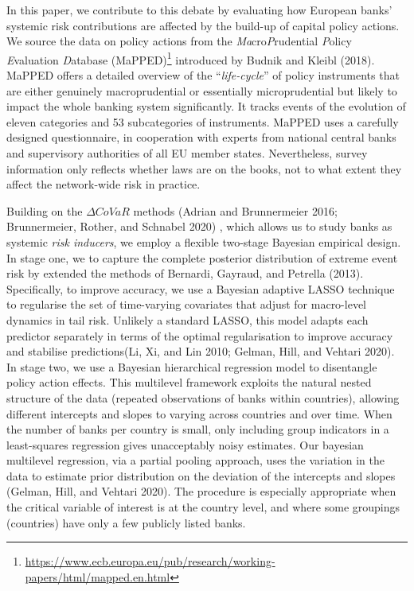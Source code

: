 \documentclass[
  10pt,
]{article}
\begin{document}
In this paper, we contribute to this debate by evaluating how European
banks' systemic risk contributions are affected by the build-up of
capital policy actions. We source the data on policy actions from the
\emph{Ma}cro\emph{P}rudential \emph{P}olicy \emph{E}valuation
\emph{D}atabase (MaPPED)\footnote{\url{https://www.ecb.europa.eu/pub/research/working-papers/html/mapped.en.html}}
introduced by Budnik and Kleibl (2018). MaPPED offers a detailed
overview of the ``\emph{life-cycle}'' of policy instruments that are
either genuinely macroprudential or essentially microprudential but
likely to impact the whole banking system significantly. It tracks
events of the evolution of eleven categories and 53 subcategories of
instruments. MaPPED uses a carefully designed questionnaire, in
cooperation with experts from national central banks and supervisory
authorities of all EU member states. Nevertheless, survey information
only reflects whether laws are on the books, not to what extent they
affect the network-wide risk in practice.

Building on the \(\Delta CoVaR\) methods (Adrian and Brunnermeier 2016;
Brunnermeier, Rother, and Schnabel 2020) , which allows us to study
banks as systemic \emph{risk inducers}, we employ a flexible two-stage
Bayesian empirical design. In stage one, we to capture the complete
posterior distribution of extreme event risk by extended the methods of
Bernardi, Gayraud, and Petrella (2013). Specifically, to improve
accuracy, we use a Bayesian adaptive LASSO technique to regularise the
set of time-varying covariates that adjust for macro-level dynamics in
tail risk. Unlikely a standard LASSO, this model adapts each predictor
separately in terms of the optimal regularisation to improve accuracy
and stabilise predictions(Li, Xi, and Lin 2010; Gelman, Hill, and
Vehtari 2020). In stage two, we use a Bayesian hierarchical regression
model to disentangle policy action effects. This multilevel framework
exploits the natural nested structure of the data (repeated observations
of banks within countries), allowing different intercepts and slopes to
varying across countries and over time. When the number of banks per
country is small, only including group indicators in a least-squares
regression gives unacceptably noisy estimates. Our bayesian multilevel
regression, via a partial pooling approach, uses the variation in the
data to estimate prior distribution on the deviation of the intercepts
and slopes (Gelman, Hill, and Vehtari 2020). The procedure is especially
appropriate when the critical variable of interest is at the country
level, and where some groupings (countries) have only a few publicly
listed banks.
\end{document}
